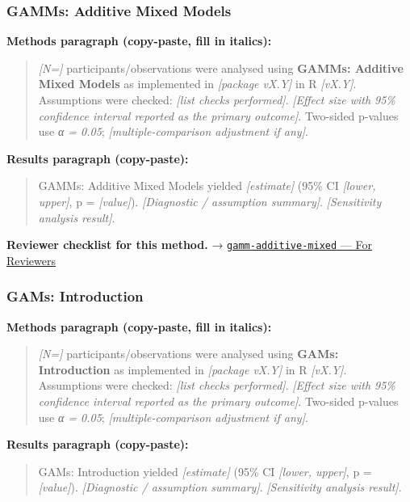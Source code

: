 \documentclass[
]{article}
\begin{document}
\subsubsection{GAMMs: Additive Mixed
Models}\label{gamms-additive-mixed-models}

\textbf{Methods paragraph (copy-paste, fill in italics):}

\begin{quote}
\emph{{[}N={]}} participants/observations were analysed using
\textbf{GAMMs: Additive Mixed Models} as implemented in \emph{{[}package
vX.Y{]}} in R \emph{{[}vX.Y{]}}. Assumptions were checked: \emph{{[}list
checks performed{]}}. \emph{{[}Effect size with 95\% confidence interval
reported as the primary outcome{]}}. Two-sided p-values use \emph{α =
0.05}; \emph{{[}multiple-comparison adjustment if any{]}}.
\end{quote}

\textbf{Results paragraph (copy-paste):}

\begin{quote}
GAMMs: Additive Mixed Models yielded \emph{{[}estimate{]}} (95\% CI
\emph{{[}lower, upper{]}}, p = \emph{{[}value{]}}). \emph{{[}Diagnostic
/ assumption summary{]}}. \emph{{[}Sensitivity analysis result{]}}.
\end{quote}

\textbf{Reviewer checklist for this method.} →
\href{../chapters/07-regression/gamm-additive-mixed.Rmd\#for-reviewers}{\texttt{gamm-additive-mixed}
--- For Reviewers}

\subsubsection{GAMs: Introduction}\label{gams-introduction}

\textbf{Methods paragraph (copy-paste, fill in italics):}

\begin{quote}
\emph{{[}N={]}} participants/observations were analysed using
\textbf{GAMs: Introduction} as implemented in \emph{{[}package vX.Y{]}}
in R \emph{{[}vX.Y{]}}. Assumptions were checked: \emph{{[}list checks
performed{]}}. \emph{{[}Effect size with 95\% confidence interval
reported as the primary outcome{]}}. Two-sided p-values use \emph{α =
0.05}; \emph{{[}multiple-comparison adjustment if any{]}}.
\end{quote}

\textbf{Results paragraph (copy-paste):}

\begin{quote}
GAMs: Introduction yielded \emph{{[}estimate{]}} (95\% CI
\emph{{[}lower, upper{]}}, p = \emph{{[}value{]}}). \emph{{[}Diagnostic
/ assumption summary{]}}. \emph{{[}Sensitivity analysis result{]}}.
\end{quote}
\end{document}
